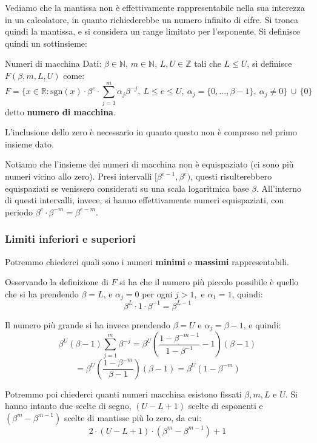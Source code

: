 \documentclass[a4paper,11pt]{article}
\begin{document}
Vediamo che la mantissa non è effettivamente rappresentabile nella sua interezza in un calcolatore, in quanto richiederebbe un numero infinito di cifre. 
Si tronca quindi la mantissa, e si considera un range limitato per l'esponente.
Si definisce quindi un sottinsieme:
\begin{definition}{Numeri di macchina}
	Dati:
	$\beta \in \mathbb{N}$, $m \in \mathbb{N}$, $L, U \in \mathbb{Z}$ tali che $L \leq U$, si definisce $F(\beta, m, L, U)$ come:
			$$
			F =\{ x \in \mathbb{R} : \mathrm{sgn}(x) \cdot \beta^e \cdot \sum_{j=1}^m \alpha_j \beta^{-j}, \ L \leq e \leq U, \ \alpha_j = \{ 0, ..., \beta - 1 \}, \ \alpha_j \neq 0 \} \, \cup \, \{0\}
			$$
			detto \textbf{numero di macchina}.
\end{definition}

L'inclusione dello zero è necessario in quanto questo non è compreso nel primo insieme dato.

Notiamo che l'insieme dei numeri di macchina non è equispaziato (ci sono più numeri vicino allo zero).
Presi intervalli $[\beta^{e - 1}, \beta^e)$, questi risulterebbero equispaziati se venissero considerati su una scala logaritmica base $\beta$.
All'interno di questi intervalli, invece, si hanno effettivamente numeri equispaziati, con periodo $\beta^e \cdot \beta^{-m} = \beta^{e - m}$.

\subsubsection{Limiti inferiori e superiori}

Potremmo chiederci quali sono i numeri \textbf{minimi} e \textbf{massimi} rappresentabili.

Osservando la definizione di $F$ si ha che il numero più piccolo possibile è quello che si ha prendendo $\beta =L$, e $\alpha_j = 0$ per ogni $j > 1,$ e $\alpha_1 =1$, quindi:
$$
\beta^L \cdot 1 \cdot \beta^{-1} = \beta^{L - 1}
$$

Il numero più grande si ha invece prendendo $\beta = U$ e $\alpha_j = \beta - 1$, e quindi:
$$
\beta^U (\beta - 1) \sum_{j=1}^m \beta^{-j} = \beta^U \left( \frac{1-\beta^{-m-1}}{1-\beta^{-1}} - 1\right) (\beta - 1)
$$
$$
= \beta^U \left( \frac{1-\beta^{-m}}{\beta - 1} \right) (\beta - 1) = \beta^U (1 - \beta^{-m}) 
$$

Potremmo poi chiederci quanti numeri macchina esistono fissati $\beta, m, L$ e $U$. 
Si hanno intanto due scelte di segno, $(U - L  + 1)$ scelte di esponenti e $(\beta^m - \beta^{m - 1})$ scelte di mantisse più lo zero, da cui:
$$
2 \cdot (U - L  + 1) \cdot (\beta^m - \beta^{m - 1}) + 1
$$
\end{document}

